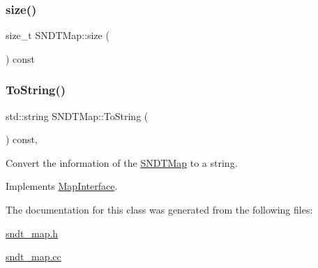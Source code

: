 \mbox{\label{classSNDTMap_a5dadf53cf219ea37fb6bba8c70b41a5e}} 
\subsubsection{\texorpdfstring{size()}{size()}}
{\footnotesize\ttfamily size\+\_\+t S\+N\+D\+T\+Map\+::size (\begin{DoxyParamCaption}{ }\end{DoxyParamCaption}) const\hspace{0.3cm}{\ttfamily [inline]}}

\mbox{\label{classSNDTMap_a38be62c377da486f006e194e24e77212}} 
\subsubsection{\texorpdfstring{To\+String()}{ToString()}}
{\footnotesize\ttfamily std\+::string S\+N\+D\+T\+Map\+::\+To\+String (\begin{DoxyParamCaption}{ }\end{DoxyParamCaption}) const\hspace{0.3cm}{\ttfamily [override]}, {\ttfamily [virtual]}}



Convert the information of the \hyperlink{classSNDTMap}{S\+N\+D\+T\+Map} to a string. 



Implements \hyperlink{classMapInterface_a87b132e1a619eb21e0ac684fc25f8c74}{Map\+Interface}.



The documentation for this class was generated from the following files\+:\begin{DoxyCompactItemize}
\item 
\hyperlink{sndt__map_8h}{sndt\+\_\+map.\+h}\item 
\hyperlink{sndt__map_8cc}{sndt\+\_\+map.\+cc}\end{DoxyCompactItemize}
